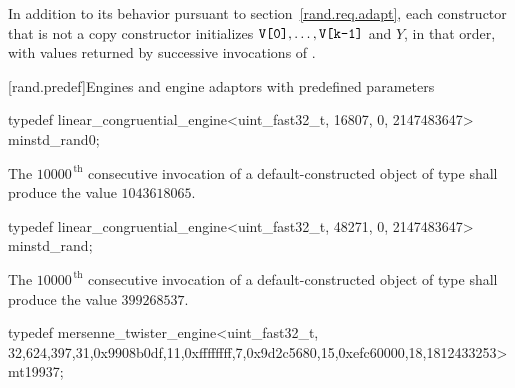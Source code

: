 \pnum
In addition to its behavior
pursuant to section~\ref{rand.req.adapt},
each constructor%
that is not a copy constructor
initializes $\texttt{V[0]}, \ldots, \texttt{V[k-1]}$ and $Y$,
in that order,
with values returned by successive invocations of .%




[rand.predef]{Engines and engine adaptors with predefined parameters}%
%
%

%
%
\begin{itemdecl}
typedef linear_congruential_engine<uint_fast32_t, 16807, 0, 2147483647>
       minstd_rand0;
\end{itemdecl}

\begin{itemdescr}
\pnum\required
 The $10000^{\,\mathrm{th}}$ consecutive invocation
 of a default-constructed object
 of type 
 shall produce the value $1043618065$.
\end{itemdescr}

%
%
\begin{itemdecl}
typedef linear_congruential_engine<uint_fast32_t, 48271, 0, 2147483647>
       minstd_rand;
\end{itemdecl}

\begin{itemdescr}
\pnum\required
 The $10000^{\,\mathrm{th}}$ consecutive invocation
 of a default-constructed object
 of type 
 shall produce the value $399268537$.
\end{itemdescr}

%
%
\begin{itemdecl}
typedef mersenne_twister_engine<uint_fast32_t,
       32,624,397,31,0x9908b0df,11,0xffffffff,7,0x9d2c5680,15,0xefc60000,18,1812433253>
       mt19937;
\end{itemdecl}

